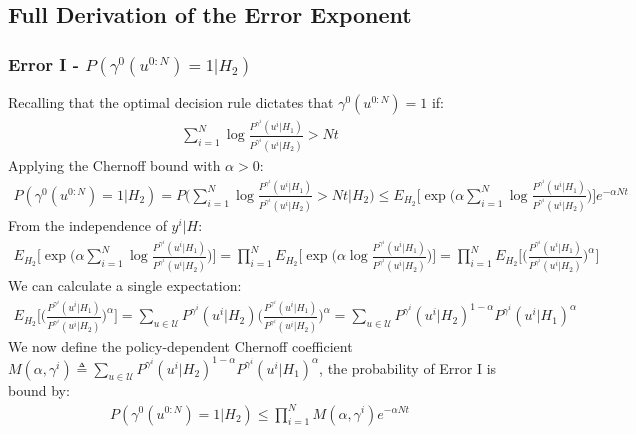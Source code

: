 \documentclass[11pt]{article}
\begin{document}
\subsection{Full Derivation of the Error Exponent}
\label{app:error-exponent}
\subsubsection*{Error I - $P(\gamma^0(u^{0:N}) = 1|H_2)$}
Recalling that the optimal decision rule dictates that $\gamma^0(u^{0:N}) = 1$ if:
\begin{align}
    \sum_{i=1}^{N}\log\frac{P^{\gamma^i}(u^i|H_1)}{P^{\gamma^i}(u^i|H_2)} > Nt
\end{align}
Applying the Chernoff bound with $\alpha > 0$:
\begin{align}
    P(\gamma^0(u^{0:N}) = 1|H_2) = P\bigg(\sum_{i=1}^{N}\log\frac{P^{\gamma^i}(u^i|H_1)}{P^{\gamma^i}(u^i|H_2)} > Nt\bigg|H_2\bigg) \leq E_{H_2}\bigg[\exp\bigg(\alpha \sum_{i=1}^{N}\log\frac{P^{\gamma^i}(u^i|H_1)}{P^{\gamma^i}(u^i|H_2)}\bigg)\bigg]e^{-\alpha Nt}
\end{align}
From the independence of $y^i|H$:
\begin{align}
    E_{H_2}\bigg[\exp\bigg(\alpha \sum_{i=1}^{N}\log\frac{P^{\gamma^i}(u^i|H_1)}{P^{\gamma^i}(u^i|H_2)}\bigg)\bigg] = \prod_{i=1}^{N}E_{H_2}\bigg[\exp\bigg(\alpha \log\frac{P^{\gamma^i}(u^i|H_1)}{P^{\gamma^i}(u^i|H_2)}\bigg)\bigg] = \prod_{i=1}^{N}E_{H_2}\bigg[\bigg(\frac{P^{\gamma^i}(u^i|H_1)}{P^{\gamma^i}(u^i|H_2)}\bigg)^\alpha\bigg]
\end{align}
We can calculate a single expectation:
\begin{align}
    E_{H_2}\bigg[\bigg(\frac{P^{\gamma^i}(u^i|H_1)}{P^{\gamma^i}(u^i|H_2)}\bigg)^\alpha\bigg] = \sum_{u \in \mathcal{U}} P^{\gamma^i}(u^i|H_2)\bigg(\frac{P^{\gamma^i}(u^i|H_1)}{P^{\gamma^i}(u^i|H_2)}\bigg)^\alpha = \sum_{u \in \mathcal{U}} P^{\gamma^i}(u^i|H_2)^{1-\alpha}P^{\gamma^i}(u^i|H_1)^{\alpha}
\end{align}
We now define the policy-dependent Chernoff coefficient $M(\alpha,\gamma^i) \triangleq \sum_{u \in \mathcal{U}} P^{\gamma^i}(u^i|H_2)^{1-\alpha}P^{\gamma^i}(u^i|H_1)^{\alpha}$, the probability of Error I is bound by:
\begin{align}
    P(\gamma^0(u^{0:N}) = 1|H_2) \leq \prod_{i=1}^{N}M(\alpha,\gamma^i)e^{-\alpha Nt}
\end{align}
\end{document}
